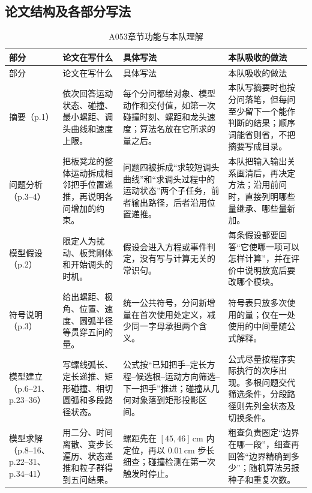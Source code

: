 \subsection{论文结构及各部分写法}

\small
\begin{longtable}{p{2.25cm}p{4.0cm}p{5.1cm}p{4.2cm}}
\caption{A053章节功能与本队理解}\label{tab:a053-structure}\\
\toprule
部分 & 论文在写什么 & 具体写法 & 本队吸收的做法\\
\midrule
\endfirsthead
\toprule
部分 & 论文在写什么 & 具体写法 & 本队吸收的做法\\
\midrule
\endhead
\bottomrule
\endfoot
摘要（p.1）
& 依次回答运动状态、碰撞、最小螺距、调头曲线和速度上限。
& 每个分问都给对象、模型动作和交付值，如第一次碰撞时刻、螺距和龙头速度；算法名放在它所求的量之后。
& 本队写摘要时也按分问落笔，但每问至少留下一个能作判断的结果；顺序词能省则省，不把摘要写成目录。\\

问题分析（p.3--4）
& 把板凳龙的整体运动拆成相邻把手位置递推，再说明各问增加的约束。
& 问题四被拆成“求较短调头曲线”和“求调头过程中的运动状态”两个子任务，前者输出路径，后者沿用位置递推。
& 本队把输入输出关系画清后，再决定方法；沿用前问时，直接列明哪些量继承、哪些量新加。\\

模型假设（p.2）
& 限定人为扰动、板凳刚体和开始调头的时机。
& 假设会进入方程或事件判定，没有写与计算无关的常识句。
& 每条假设都要回答“它使哪一项可以怎样计算”，并在评价中说明放宽后要改哪个模块。\\

符号说明（p.3）
& 给出螺距、极角、位置、速度、圆弧半径等贯穿五问的量。
& 统一公共符号，分问新增量在首次使用处定义，减少同一字母承担两个含义。
& 符号表只放多次使用的量；仅在一处使用的中间量随公式解释。\\

模型建立（p.6--21、p.23--36）
& 写螺线弧长、定长递推、矩形碰撞、相切圆弧和多段路径状态。
& 公式按“已知把手--定长方程--候选根--运动方向筛选--下一把手”推进；碰撞从几何对象落到矩形投影区间。
& 公式尽量按程序实际执行的次序出现。多根问题交代筛选条件，分段路径则先列全状态及切换条件。\\

模型求解（p.8--16、p.22--31、p.34--41）
& 用二分、时间离散、变步长遍历、状态递推和粒子群得到五问结果。
& 螺距先在 $[45,46]\,\mathrm{cm}$ 内定位，再以 $0.01\,\mathrm{cm}$ 步长细查；碰撞检测在第一次触发时停止。
& 粗查负责圈定“边界在哪一段”，细查再回答“边界精确到多少”；随机算法另报种子和重复次数。\\


\end{longtable}
